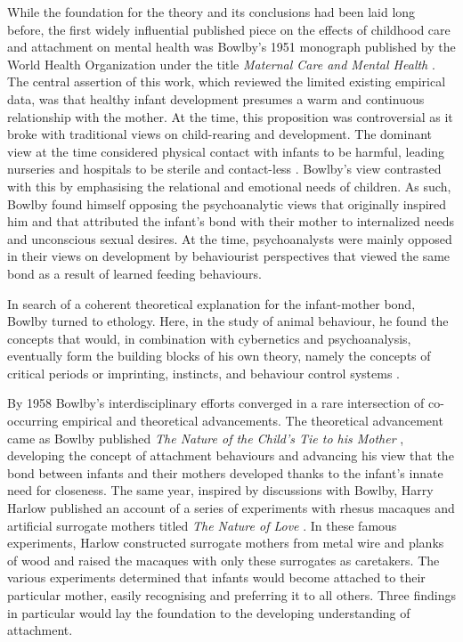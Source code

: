 \documentclass[12pt]{report}
\begin{document}
While the foundation for the theory and its conclusions had been laid long before, the first widely influential published piece on the effects of childhood care and attachment on mental health was Bowlby's 1951 monograph published by the World Health Organization under the title \textit{Maternal Care and Mental Health} \cite{bowlby1951WHO}.
The central assertion of this work, which reviewed the limited existing empirical data, was that healthy infant development presumes a warm and continuous relationship with the mother.
At the time, this proposition was controversial as it broke with traditional views on child-rearing and development. The dominant view at the time considered physical contact with infants to be harmful, leading nurseries and hospitals to be sterile and contact-less \cite{Karen1994}.
Bowlby's view contrasted with this by emphasising the relational and emotional needs of children. As such, Bowlby found himself opposing the psychoanalytic views that originally inspired him and that attributed the infant's bond with their mother to internalized needs and unconscious sexual desires.
At the time, psychoanalysts were mainly opposed in their views on development by behaviourist perspectives that viewed the same bond as a result of learned feeding behaviours.

In search of a coherent theoretical explanation for the infant-mother bond, Bowlby turned to ethology. Here, in the study of animal behaviour, he found the
concepts that would, in combination with cybernetics and psychoanalysis, eventually form the building blocks of his own theory, namely the concepts of critical periods or imprinting, instincts, and behaviour control systems \cite{bowlby1953critical,Bowlby1988}.

By 1958 Bowlby's interdisciplinary efforts converged in a rare intersection of co-occurring empirical and theoretical advancements.
The theoretical advancement came as Bowlby published \textit{The Nature of the Child's Tie to his Mother} \cite{Bowlby1958}, developing the concept of attachment behaviours and advancing his view that the bond between infants and their mothers developed thanks to the infant's innate need for closeness.
The same year, inspired by discussions with Bowlby, Harry Harlow published an account of a series of experiments with rhesus macaques and artificial surrogate mothers titled \textit{The Nature of Love} \cite{Harlow1958}.
In these famous experiments, Harlow constructed surrogate mothers from metal wire and planks of wood and raised the macaques with only these surrogates as caretakers. The various experiments determined that infants would become attached to their particular mother, easily recognising and preferring it to all others.
Three findings in particular would lay the foundation to the developing understanding of attachment.
\end{document}

